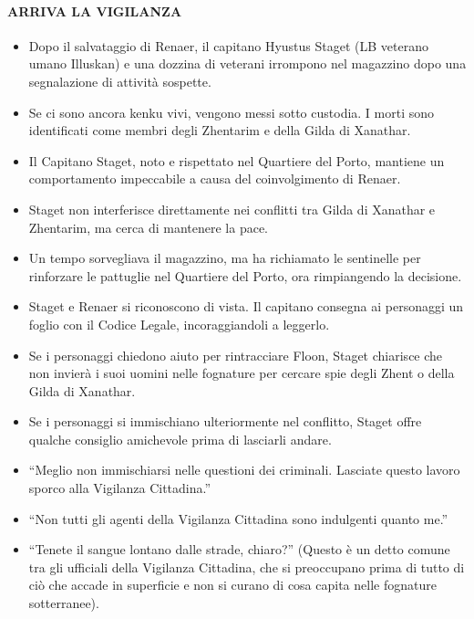 \documentclass{article}
\begin{document}
                \paragraph{ARRIVA LA VIGILANZA}
                \begin{itemize}
                    \item Dopo il salvataggio di Renaer, il capitano Hyustus Staget (LB veterano umano Illuskan) e una dozzina di veterani irrompono nel magazzino dopo una segnalazione di attività sospette.
                    \item Se ci sono ancora kenku vivi, vengono messi sotto custodia. I morti sono identificati come membri degli Zhentarim e della Gilda di Xanathar.
                    \item Il Capitano Staget, noto e rispettato nel Quartiere del Porto, mantiene un comportamento impeccabile a causa del coinvolgimento di Renaer.
                    \item Staget non interferisce direttamente nei conflitti tra Gilda di Xanathar e Zhentarim, ma cerca di mantenere la pace.
                    \item Un tempo sorvegliava il magazzino, ma ha richiamato le sentinelle per rinforzare le pattuglie nel Quartiere del Porto, ora rimpiangendo la decisione.
                    \item Staget e Renaer si riconoscono di vista. Il capitano consegna ai personaggi un foglio con il Codice Legale, incoraggiandoli a leggerlo.
                    \item Se i personaggi chiedono aiuto per rintracciare Floon, Staget chiarisce che non invierà i suoi uomini nelle fognature per cercare spie degli Zhent o della Gilda di Xanathar.
                    \item Se i personaggi si immischiano ulteriormente nel conflitto, Staget offre qualche consiglio amichevole prima di lasciarli andare.
                \end{itemize}
\begin{itemize}
    \item “Meglio non immischiarsi nelle questioni dei criminali.
    Lasciate questo lavoro sporco alla Vigilanza Cittadina.”
    \item “Non tutti gli agenti della Vigilanza Cittadina sono
    indulgenti quanto me.”
    \item “Tenete il sangue lontano dalle strade, chiaro?” (Questo è
    un detto comune tra gli ufficiali della Vigilanza Cittadina,
    che si preoccupano prima di tutto di ciò che accade in
    superficie e non si curano di cosa capita nelle fognature
    sotterranee).
\end{itemize}
\end{document}
